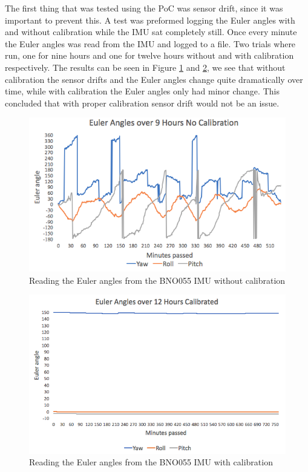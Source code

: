 The first thing that was tested using the PoC was sensor drift, since it was important to prevent this. A test was preformed logging the Euler angles with and without calibration while the IMU sat completely still. Once every minute the Euler angles was read from the IMU and logged to a file. Two trials where run, one for nine hours and one for twelve hours without and with calibration respectively. The results can be seen in Figure \ref{drift1} and \ref{drift2}, we see that without calibration the sensor drifts and the Euler angles change quite dramatically over time, while with calibration the Euler angles only had minor change. This concluded that with proper calibration sensor drift would not be an issue.

\begin{figure}[h!]
    \centering
    \includegraphics[width=1\textwidth]{figures/drift1.png}
    \caption{Reading the Euler angles from the BNO055 IMU\cite{gyro} without calibration}
    \label{drift1}
\end{figure}

\begin{figure}[h!]
    \centering
    \includegraphics[width=1\textwidth]{figures/drift2.png}
    \caption{Reading the Euler angles from the BNO055 IMU\cite{gyro} with calibration}
    \label{drift2}
\end{figure}



